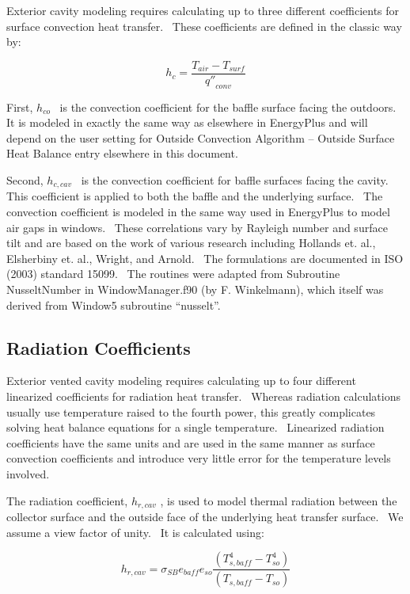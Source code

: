 Exterior cavity modeling requires calculating up to three different coefficients for surface convection heat transfer.~ These coefficients are defined in the classic way by:

\begin{equation}
{h_c} = \frac{{{T_{air}} - {T_{surf}}}}{{{{q''}_{conv}}}}
\end{equation}

First, \({h_{co}}\) ~is the convection coefficient for the baffle surface facing the outdoors.~ It is modeled in exactly the same way as elsewhere in EnergyPlus and will depend on the user setting for Outside Convection Algorithm -- Outside Surface Heat Balance entry elsewhere in this document.

Second, \({h_{c,cav}}\) ~is the convection coefficient for baffle surfaces facing the cavity.~ This coefficient is applied to both the baffle and the underlying surface.~ The convection coefficient is modeled in the same way used in EnergyPlus to model air gaps in windows.~ These correlations vary by Rayleigh number and surface tilt and are based on the work of various research including Hollands et. al., Elsherbiny et. al., Wright, and Arnold.~ The formulations are documented in ISO (2003) standard 15099.~ The routines were adapted from Subroutine NusseltNumber in WindowManager.f90 (by F. Winkelmann), which itself was derived from Window5 subroutine ``nusselt''.

\subsection{Radiation Coefficients}\label{radiation-coefficients}

Exterior vented cavity modeling requires calculating up to four different linearized coefficients for radiation heat transfer.~ Whereas radiation calculations usually use temperature raised to the fourth power, this greatly complicates solving heat balance equations for a single temperature.~ Linearized radiation coefficients have the same units and are used in the same manner as surface convection coefficients and introduce very little error for the temperature levels involved.

The radiation coefficient, \({h_{r,cav}}\) , is used to model thermal radiation between the collector surface and the outside face of the underlying heat transfer surface.~ We assume a view factor of unity.~ It is calculated using:

\begin{equation}
{h_{r,cav}} = {\sigma_{SB}}{e_{baff}}{e_{so}}\frac{{\left( {T_{s,baff}^4 - T_{so}^4} \right)}}{{\left( {{T_{s,baff}} - {T_{so}}} \right)}}
\label{eq:HrcavEquation}
\end{equation}

